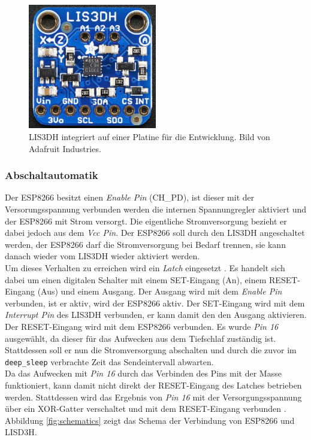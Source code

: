 \begin{figure}[h]
  \centering
	\includegraphics[width=0.5\textwidth]{images/lis3dhada.png}
  \caption{LIS3DH integriert auf einer Platine für die Entwicklung. Bild von Adafruit Industries.}
  \label{fig:lis3dh}
\end{figure}

\subsubsection{Abschaltautomatik}
\label{ch:Beschleunigungssensor:sec:Abschaltautomatik}
Der ESP8266 besitzt einen \emph{Enable Pin} (CH\_PD), ist dieser mit der Versorungsspannung verbunden werden die internen Spannungregler aktiviert und der ESP8266 mit Strom versorgt.
Die eigentliche Stromversorgung bezieht er dabei jedoch aus dem \emph{Vcc Pin}.
Der ESP8266 soll durch den LIS3DH angeschaltet werden, der ESP8266 darf die Stromversorgung bei Bedarf trennen, sie kann danach wieder vom LIS3DH wieder aktiviert werden. \\
Um dieses Verhalten zu erreichen wird ein \emph{Latch} eingesetzt \cite{texas2003latch}.
Es handelt sich dabei um einen digitalen Schalter mit einem SET-Eingang (An), einem RESET-Eingang (Aus) und einem Ausgang.
Der Ausgang wird mit dem \emph{Enable Pin} verbunden, ist er aktiv, wird der ESP8266 aktiv.
Der SET-Eingang wird mit dem \emph{Interrupt Pin} des LIS3DH verbunden, er kann damit den den Ausgang aktivieren.
Der RESET-Eingang wird mit dem ESP8266 verbunden. 
Es wurde \emph{Pin 16} ausgewählt, da dieser für das Aufwecken aus dem Tiefschlaf zuständig ist. 
Stattdessen soll er nun die Stromversorgung abschalten und durch die zuvor im \texttt{deep\_sleep} verbrachte Zeit das Sendeintervall abwarten.\\
Da das Aufwecken mit \emph{Pin 16} durch das Verbinden des Pins mit der Masse funktioniert, kann damit nicht direkt der RESET-Eingang des Latches betrieben werden.
Stattdessen wird das Ergebnis von \emph{Pin 16} mit der Versorgungsspannung über ein XOR-Gatter verschaltet und mit dem RESET-Eingang verbunden \cite{texas2014xor}.
Abbildung \ref{fig:schematics} zeigt das Schema der Verbindung von ESP8266 und LISD3H.

